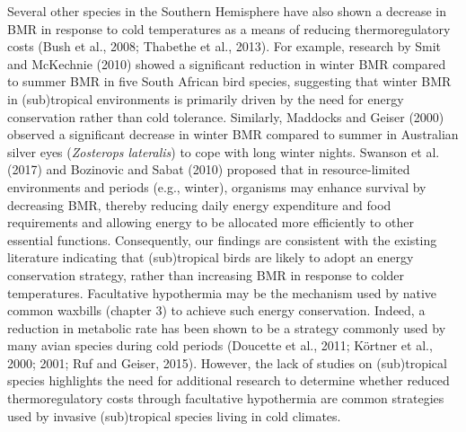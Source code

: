 \documentclass[10pt, twoside]{book} %
\begin{document}
Several other species in the Southern Hemisphere have also shown a decrease in BMR in response to cold temperatures as a means of reducing thermoregulatory costs (Bush et al., 2008; Thabethe et al., 2013). For example, research by Smit and McKechnie (2010) showed a significant reduction in winter BMR compared to summer BMR in five South African bird species, suggesting that winter BMR in (sub)tropical environments is primarily driven by the need for energy conservation rather than cold tolerance. Similarly, Maddocks and Geiser (2000) observed a significant decrease in winter BMR compared to summer in Australian silver eyes (\textit{Zosterops lateralis}) to cope with long winter nights. Swanson et al. (2017) and Bozinovic and Sabat (2010) proposed that in resource-limited environments and periods (e.g., winter), organisms may enhance survival by decreasing BMR, thereby reducing daily energy expenditure and food requirements and allowing energy to be allocated more efficiently to other essential functions. Consequently, our findings are consistent with the existing literature indicating that (sub)tropical birds are likely to adopt an energy conservation strategy, rather than increasing BMR in response to colder temperatures. Facultative hypothermia may be the mechanism used by native common waxbills (chapter 3) to achieve such energy conservation. Indeed, a reduction in metabolic rate has been shown to be a strategy commonly used by many avian species during cold periods (Doucette et al., 2011; Körtner et al., 2000; 2001; Ruf and Geiser, 2015). However, the lack of studies on (sub)tropical species highlights the need for additional research to determine whether reduced thermoregulatory costs through facultative hypothermia are common strategies used by invasive (sub)tropical species living in cold climates.\\
\end{document}
